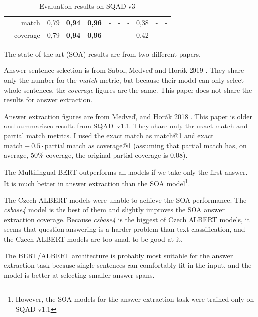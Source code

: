 \documentclass[
  printed, %
  color,   %
  table,   %
  oneside, %
  lof,     %
  lot,     %
]{fithesis3}
\begin{document}
\begin{table}[h]
\begin{adjustbox}{center}
\begin{tabular}{rr|c|c|c|c|c|c|c|c|c}
        \cellcolor{thesis@color@tableOdd} & match &
            0,79 & \textbf{0,94} & \textbf{0,96} & - & - & - & 0,38 & - & - \\
        \cellcolor{thesis@color@tableOdd}\multirow{-2}{*}{SOA} & coverage &
            0,79 & \textbf{0,94} & \textbf{0,96} & - & - & - & 0,42 & - & - \\
        
\end{tabular}
\end{adjustbox}
\caption[Evaluation results on SQAD v3]
{Evaluation results on SQAD v3}
\label{tab:sqad-results}
\end{table} %

\vspace{1em}

{\parindent=0pt
    The state-of-the-art (SOA) results are from two different papers.
}

Answer sentence selection is from Sabol, Medveď and Horák 2019 \parencite[Table 3]{sqad}. They share only the number for the \textit{match} metric, but because their model can only select whole sentences, the \textit{coverage} figures are the same. This paper does not share the results for answer extraction.

Answer extraction figures are from Medveď, and Horák 2018 \parencite[Table 1 a)]{sqadv1}. This paper is older and summarizes results from SQAD~v1.1. They share only the exact match and partial match metrics. I used the exact match as match@1 and exact $\text{match} + 0.5 \cdot \text{partial match}$  as coverage@1 (assuming that partial match has, on average, 50\% coverage, the original partial coverage is 0.08).  


The Multilingual BERT outperforms all models if we take only the first answer. It is much better in answer extraction than the SOA model\footnote{However, the SOA models for the answer extraction task were trained only on SQAD v1.1}.

The Czech ALBERT models were unable to achieve the SOA performance. The \textit{csbase4} model is the best of them and slightly improves the SOA answer extraction coverage. Because \textit{csbase4} is the biggest of Czech ALBERT models, it seems that question answering is a harder problem than text classification, and the Czech ALBERT models are too small to be good at it. 

The BERT/ALBERT architecture is probably most suitable for the answer extraction task because single sentences can comfortably fit in the input, and the model is better at selecting smaller answer spans. 
\end{document}
